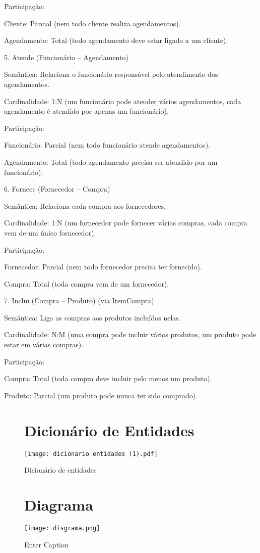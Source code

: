 \documentclass{article}
\begin{document}
Participação:

Cliente: Parcial (nem todo cliente realiza agendamentos).

Agendamento: Total (todo agendamento deve estar ligado a um cliente).

5. Atende (Funcionário – Agendamento)

Semântica: Relaciona o funcionário responsável pelo atendimento dos agendamentos.

Cardinalidade: 1:N (um funcionário pode atender vários agendamentos, cada agendamento é atendido por apenas um funcionário).

Participação:

Funcionário: Parcial (nem todo funcionário atende agendamentos).

Agendamento: Total (todo agendamento precisa ser atendido por um funcionário).

6. Fornece (Fornecedor – Compra)

Semântica: Relaciona cada compra aos fornecedores.

Cardinalidade: 1:N (um fornecedor pode fornecer várias compras, cada compra vem de um único fornecedor).

Participação:

Fornecedor: Parcial (nem todo fornecedor precisa ter fornecido).

Compra: Total (toda compra vem de um fornecedor).

7. Inclui (Compra – Produto) (via ItemCompra)

Semântica: Liga as compras aos produtos incluídos nelas.

Cardinalidade: N:M (uma compra pode incluir vários produtos, um produto pode estar em várias compras).

Participação:

Compra: Total (toda compra deve incluir pelo menos um produto).

Produto: Parcial (um produto pode nunca ter sido comprado).

\begin{figure}

\section{Dicionário de Entidades}

    \centering
    \texttt{[image: dicionario entidades (1).pdf]}
    \caption{Dicionário de entidades}
    \label{fig:placeholder}
\end{figure}

\begin{figure}
\section{Diagrama}
    \centering
    \texttt{[image: disgrama.png]}
    \caption{Enter Caption}
    \label{fig:placeholder}
\end{figure}
\end{document}
